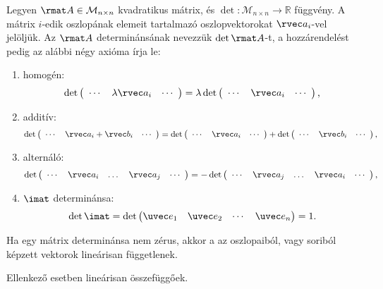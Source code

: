 \documentclass[a4paper, 12pt]{scrartcl}
\begin{document}
\begin{definition}[Determináns]
  \newcommand\noskp{\vspace{-3mm}}
  \newcommand{\edet}[1]{\det \begin{pmatrix} \phantom{i}\cdots & #1 & \cdots\phantom{i} \end{pmatrix}}
  Legyen $\rmat A \in \mathcal M_{n \times n}$ kvadratikus mátrix, és
  $\det: \mathcal M_{n \times n} \rightarrow \mathbb R$ függvény. A mátrix
  $i$-edik oszlopának elemeit tartalmazó oszlopvektorokat $\rvec a_i$-vel
  jelöljük. Az $\rmat A$ determinánsának nevezzük $\det \rmat A$-t, a
  hozzárendelést pedig az alábbi négy axióma írja le:
  \begin{enumerate}
    \item homogén:
          $$
            \edet{\lambda \rvec a_i} = \lambda \edet{\rvec a_i}
            \text,
          $$
    \item \noskp additív:\noskp
          $$
            \edet{\rvec a_i + \rvec b_i} =
            \edet{\rvec a_i} + \edet{\rvec b_i}
            \text,
          $$
    \item \noskp alternáló:\noskp
          $$
            \edet{\rvec a_i & \dots & \rvec a_j} =
            - \edet{\rvec a_j & \dots & \rvec a_i}
            \text,
          $$
    \item \noskp $\imat$ determinánsa:
          $$
            \det \imat =\det \begin{pmatrix}
              \uvec e_1 & \uvec e_2 & \cdots & \uvec e_n
            \end{pmatrix} = 1
            \text.
          $$
  \end{enumerate}
\end{definition}

\begin{note}
  Ha egy mátrix determinánsa nem zérus, akkor a az oszlopaiból, vagy soriból
  képzett vektorok lineárisan függetlenek.

  Ellenkező esetben lineárisan összefüggőek.
\end{note}
\end{document}
